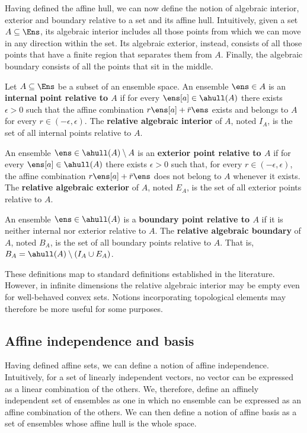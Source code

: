 Having defined the affine hull, we can now define the notion of algebraic interior, exterior and boundary relative to a set and its affine hull. Intuitively, given a set $A \subseteq \Ens$, its algebraic interior includes all those points from which we can move in any direction within the set. Its algebraic exterior, instead, consists of all those points that have a finite region that separates them from $A$. Finally, the algebraic boundary consists of all the points that sit in the middle.

\begin{mathSection}
\begin{defn}
	Let $A \subseteq \Ens$ be a subset of an ensemble space. An ensemble $\ens \in A$ is an \textbf{internal point relative to $A$} if for every $\ens[a] \in \ahull(A)$ there exists $\epsilon > 0$ such that the affine combination $r\ens[a] + \bar{r}\ens$ exists and belongs to $A$ for every $r \in (-\epsilon,\epsilon)$. The \textbf{relative algebraic interior} of $A$, noted $I_A$, is the set of all internal points relative to $A$.
	
	An ensemble $\ens \in \ahull(A)\setminus A$ is an \textbf{exterior point relative to $A$} if for every $\ens[a] \in \ahull(A)$ there exists $\epsilon > 0$ such that, for every $r \in (-\epsilon,\epsilon)$, the affine combination $r\ens[a] + \bar{r}\ens$ does not belong to $A$ whenever it exists. The \textbf{relative algebraic exterior} of $A$, noted $E_A$, is the set of all exterior points relative to $A$.
	
	An ensemble $\ens \in \ahull(A)$ is a \textbf{boundary point relative to $A$} if it is neither internal nor exterior relative to $A$. The \textbf{relative algebraic boundary} of $A$, noted $B_A$, is the set of all boundary points relative to $A$. That is, $B_A = \ahull(A)\setminus(I_A\cup E_A)$.
\end{defn}
\end{mathSection}

These definitions map to standard definitions established in the literature. However, in infinite dimensions the relative algebraic interior may be empty even for well-behaved convex sets. Notions incorporating topological elements may therefore be more useful for some purposes.

\subsection{Affine independence and basis}

Having defined affine sets, we can define a notion of affine independence. Intuitively, for a set of linearly independent vectors, no vector can be expressed as a linear combination of the others. We, therefore, define an affinely independent set of ensembles as one in which no ensemble can be expressed as an affine combination of the others. We can then define a notion of affine basis as a set of ensembles whose affine hull is the whole space.

